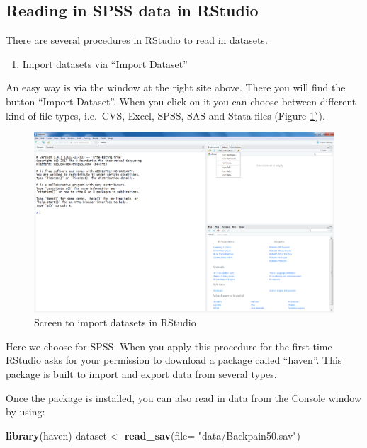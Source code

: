 \documentclass[]{book}
\newenvironment{Shaded}{\begin{snugshade}}{\end{snugshade}}
\newcommand{\KeywordTok}[1]{\textcolor[rgb]{0.13,0.29,0.53}{\textbf{#1}}}
\newcommand{\DataTypeTok}[1]{\textcolor[rgb]{0.13,0.29,0.53}{#1}}
\newcommand{\StringTok}[1]{\textcolor[rgb]{0.31,0.60,0.02}{#1}}
\newcommand{\NormalTok}[1]{#1}
\providecommand{\tightlist}{%
  \setlength{\itemsep}{0pt}\setlength{\parskip}{0pt}}
\begin{document}
\subsection{Reading in SPSS data in
RStudio}\label{reading-in-spss-data-in-rstudio}

There are several procedures in RStudio to read in datasets.

\begin{enumerate}
\def\labelenumi{\arabic{enumi}.}
\tightlist
\item
  Import datasets via ``Import Dataset''
\end{enumerate}

An easy way is via the window at the right site above. There you will
find the button ``Import Dataset''. When you click on it you can choose
between different kind of file types, i.e.~CVS, Excel, SPSS, SAS and
Stata files (Figure \ref{fig:fig13})).

\begin{figure}

{\centering \includegraphics[width=0.95\linewidth]{images/fig1.13} 

}

\caption{Screen to import datasets in RStudio}\label{fig:fig13}
\end{figure}

Here we choose for SPSS. When you apply this procedure for the first
time RStudio asks for your permission to download a package called
``haven''. This package is built to import and export data from several
types.

Once the package is installed, you can also read in data from the
Console window by using:

\begin{Shaded}
\begin{Highlighting}[]
\KeywordTok{library}\NormalTok{(haven)}
\NormalTok{dataset <-}\StringTok{ }\KeywordTok{read_sav}\NormalTok{(}\DataTypeTok{file=} \StringTok{"data/Backpain50.sav"}\NormalTok{)}
\end{Highlighting}
\end{Shaded}
\end{document}
